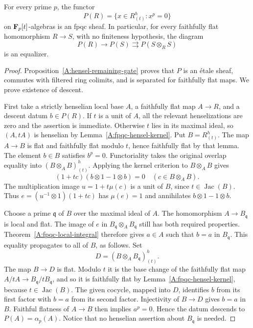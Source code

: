 \begin{theorem}
\label{A:hensel-fpqc}
For every prime $p$, the functor
\[
 P(R)=\{x\in R^h_{(t)}:x^p=0\}
\]
on $\mathbf F_p[t]$-algebras is an fpqc sheaf.  In particular, for every
faithfully flat homomorphism $R\to S$, with no finiteness
hypothesis, the diagram
\[
 P(R)\longrightarrow P(S)\rightrightarrows P(S\otimes_R S)
\]
is an equalizer.
\end{theorem}
\begin{proof}
Proposition~\ref{A:hensel-remaining-gate} proves that $P$ is an
\'etale sheaf, commutes with filtered ring colimits, and is
separated for faithfully flat maps.  We prove existence of descent.

First take a strictly henselian local base $A$, a faithfully flat
map $A\to R$, and a descent datum $b\in P(R)$.  If $t$ is a
unit of $A$, all the relevant henselizations are zero and the
assertion is immediate.  Otherwise $t$ lies in its maximal ideal,
so $(A,tA)$ is henselian by
Lemma~\ref{A:fpqc-hensel-kernel}.  Put $B=R^h_{(t)}$.
The map $A\to B$ is flat and faithfully flat modulo $t$, hence
faithfully flat by that lemma.  The element $b\in B$ satisfies
$b^p=0$.  Functoriality takes the original overlap equality into
$(B\otimes_A B)^h_{(t)}$.  Applying the kernel criterion to
$B\otimes_A B$ gives
\[
             (1+tc)(b\otimes1-1\otimes b)=0
             \quad(c\in B\otimes_A B).             \tag{A.s2}
\]
The multiplication image $u=1+t\mu(c)$ is a unit of $B$, since
$t\in\operatorname{Jac}(B)$.  Thus
$e=(u^{-1}\otimes1)(1+tc)$ has $\mu(e)=1$ and annihilates
$b\otimes1-1\otimes b$.

Choose a prime $\mathfrak q$ of $B$ over the maximal ideal of
$A$.  The homomorphism $A\to B_{\mathfrak q}$ is local and flat.
The image of $e$ in $B_{\mathfrak q}\otimes_A B_{\mathfrak q}$
still has both required properties.  Theorem~\ref{A:fpqc-local-integral}
therefore gives $a\in A$ such that $b=a$ in $B_{\mathfrak q}$.
This equality propagates to all of $B$, as follows.  Set
\[
                D=(B\otimes_A B_{\mathfrak q})^h_{(t)}.
\]
The map $B\to D$ is flat.  Modulo $t$ it is the base change
of the faithfully flat map $A/tA\to B_{\mathfrak q}/tB_{\mathfrak q}$,
and so it is faithfully flat by
Lemma~\ref{A:fpqc-hensel-kernel}, because $t\in\operatorname{Jac}(B)$.
The given cocycle, mapped into $D$, identifies $b$ from its first
factor with $b=a$ from its second factor.  Injectivity of $B\to D$
gives $b=a$ in $B$.  Faithful flatness of $A\to B$ then implies
$a^p=0$.  Hence the datum descends to $P(A)=\alpha_p(A)$.
Notice that no henselian assertion about $B_{\mathfrak q}$ is
needed.


\end{proof}
